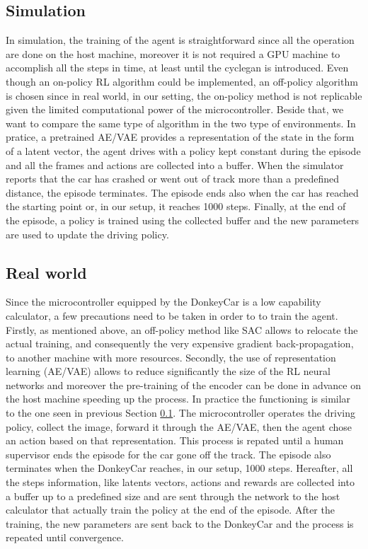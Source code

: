 \subsection{Simulation}\label{subsec:sim}
In simulation, the training of the agent is straightforward since all the operation are done on the host machine, moreover it is not required a GPU machine to accomplish all the steps in time, at least until the cyclegan is introduced. Even though an on-policy RL algorithm could be implemented, an off-policy algorithm is chosen since in real world, in our setting, the on-policy method is not replicable given the limited computational power of the microcontroller. Beside that, we want to compare the same type of algorithm in the two type of environments. In pratice, a pretrained AE/VAE provides a representation of the state in the form of a latent vector, the agent drives with a policy kept constant during the episode and all the frames and actions are collected into a buffer. When the simulator reports that the car has crashed or went out of track more than a predefined distance, the episode terminates. The episode ends also when the car has reached the starting point or, in our setup, it reaches 1000 steps. Finally, at the end of the episode, a policy is trained using the collected buffer and the new parameters are used to update the driving policy.

\subsection{Real world} \label{subsec:real}
Since the microcontroller equipped by the DonkeyCar is a low capability calculator, a few precautions need to be taken in order to to train the agent. Firstly, as mentioned above, an off-policy method like SAC allows to relocate the actual training, and consequently the very expensive gradient back-propagation, to another machine with more resources. Secondly, the use of representation learning (AE/VAE) allows to reduce significantly the size of the RL neural networks and moreover the pre-training of the encoder can be done in advance on the host machine speeding up the process. In practice the functioning is similar to the one seen in previous Section \ref{subsec:sim}. The microcontroller operates the driving policy, collect the image, forward it through the AE/VAE, then the agent chose an action based on that representation. This process is repated until a human supervisor ends the episode for the car gone off the track. The episode also terminates when the DonkeyCar reaches, in our setup, 1000 steps. Hereafter, all the steps information, like latents vectors, actions and rewards are collected into a buffer up to a predefined size and are sent through the network to the host calculator that actually train the policy at the end of the episode. After the training, the new parameters are sent back to the DonkeyCar and the process is repeated until convergence.

